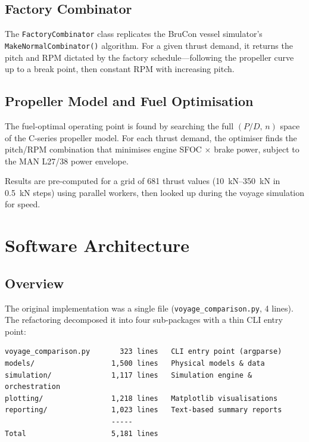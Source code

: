 \documentclass[a4paper,11pt]{article}
\begin{document}
\subsection{Factory Combinator}
\label{sec:org59807d1}

The \texttt{FactoryCombinator} class replicates the BruCon vessel simulator's
\texttt{MakeNormalCombinator()} algorithm.  For a given thrust demand, it returns the
pitch and RPM dictated by the factory schedule---following the propeller curve up
to a break point, then constant RPM with increasing pitch.

\subsection{Propeller Model and Fuel Optimisation}
\label{sec:org5663a8f}

The fuel-optimal operating point is found by searching the full \((P/D,\, n)\)
space of the C-series propeller model.  For each thrust demand, the optimiser
finds the pitch/RPM combination that minimises engine SFOC \(\times\) brake power,
subject to the MAN L27/38 power envelope.

Results are pre-computed for a grid of 681 thrust values
(\SIrange{10}{350}{\kilo\newton} in \SI{0.5}{\kilo\newton} steps) using parallel
workers, then looked up during the voyage simulation for speed.

\section{Software Architecture}
\label{sec:org7f67e80}

\subsection{Overview}
\label{sec:org61c8203}

The original implementation was a single file (\texttt{voyage\_comparison.py},
4 lines).  The refactoring decomposed it into four sub-packages
with a thin CLI entry point:

\begin{verbatim}
voyage_comparison.py       323 lines   CLI entry point (argparse)
models/                  1,500 lines   Physical models & data
simulation/              1,117 lines   Simulation engine & orchestration
plotting/                1,218 lines   Matplotlib visualisations
reporting/               1,023 lines   Text-based summary reports
                         -----
Total                    5,181 lines
\end{verbatim}
\end{document}
